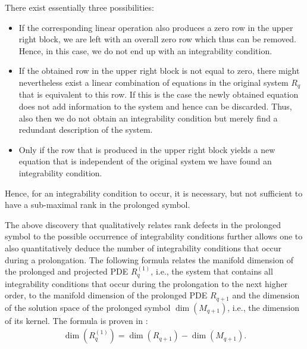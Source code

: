 There exist essentially three possibilities:
\begin{itemize}
    \item If the corresponding linear operation also produces a zero row in the upper right block, we are left with an overall zero row which thus can be removed. 
    Hence, in this case, we do not end up with an integrability condition.\\
    \item If the obtained row in the upper right block is not equal to zero, there might nevertheless exist a linear combination of equations in the original system $R_q$ that is equivalent to this row. 
    If this is the case the newly obtained equation does not add information to the system and hence can be discarded. Thus, also then we do not obtain an integrability condition but merely find a redundant description of the system.\\
    \item Only if the row that is produced in the upper right block yields a new equation that is independent of the original system we have found an integrability condition.  
\end{itemize}
Hence, for an integrability condition to occur, it is necessary, but not sufficient to have a sub-maximal rank in the prolonged symbol.

The above discovery that qualitatively relates rank defects in the prolonged symbol to the possible occurrence of integrability conditions further allows one  to also quantitatively deduce the number of integrability conditions that occur during a prolongation.
The following formula relates the manifold dimension of the prolonged and projected PDE $R_q^{(1)}$, i.e., the system that contains all integrability conditions that occur during the prolongation to the next higher order, to the manifold dimension of the prolonged PDE $R_{q+1}$ and the dimension of the solution space of the prolonged symbol $\operatorname{dim}(M_{q+1})$, i.e., the dimension of its kernel. The formula is proven in \cite{seiler1994analysis}:
\begin{align}
    \operatorname{dim}(R_{q}^{(1)}) = \operatorname{dim}(R_{q+1}) - \operatorname{dim}(M_{q+1}).
\end{align}

